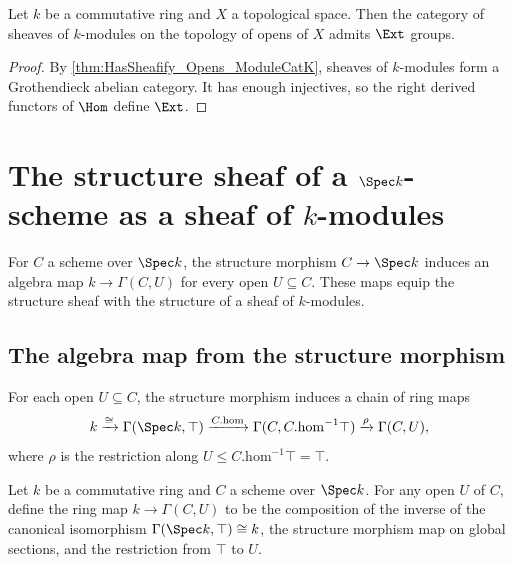 \begin{theorem}\leanok
  \label{thm:HasExt_Sheaf_Opens_ModuleCatK}

  Let \(k\) be a commutative ring and \(X\) a topological space. Then the category of sheaves of \(k\)-modules on the topology of opens of \(X\) admits \(\Ext\) groups.
\end{theorem}

\begin{proof}


\leanok
  By \cref{thm:HasSheafify_Opens_ModuleCatK}, sheaves of \(k\)-modules form a Grothendieck abelian category. It has enough injectives, so the right derived functors of \(\Hom\) define \(\Ext\).
\end{proof}

\section{The structure sheaf of a \(\Spec k\)-scheme as a sheaf of \(k\)-modules}
\label{sec:scheme_toModuleKSheaf}

For \(C\) a scheme over \(\Spec k\), the structure morphism \(C \to \Spec k\) induces an algebra map \(k \to \Gamma(C, U)\) for every open \(U \subseteq C\). These maps equip the structure sheaf with the structure of a sheaf of \(k\)-modules.

\subsection{The algebra map from the structure morphism}

For each open \(U \subseteq C\), the structure morphism induces a chain of ring maps
\[
  k \xrightarrow{\cong} \Gamma(\Spec k, \top) \xrightarrow{C.\mathrm{hom}} \Gamma(C, C.\mathrm{hom}^{-1}\top) \xrightarrow{\rho} \Gamma(C, U),
\]
where \(\rho\) is the restriction along \(U \le C.\mathrm{hom}^{-1}\top = \top\).

\begin{definition}\leanok
  \label{def:Scheme_kToSection}

  Let \(k\) be a commutative ring and \(C\) a scheme over \(\Spec k\). For any open \(U\) of \(C\), define the ring map \(k \to \Gamma(C, U)\) to be the composition of the inverse of the canonical isomorphism \(\Gamma(\Spec k, \top) \cong k\), the structure morphism map on global sections, and the restriction from \(\top\) to \(U\).
\end{definition}

